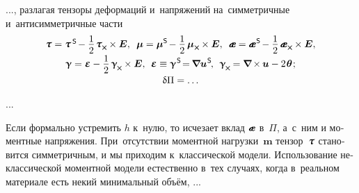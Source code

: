 \begin{otherlanguage}{russian}
..., разлагая тензоры деформаций и~напряжений на~симметричные и~антисимметричные части
\begin{equation}
\begin{array}{c}
\mathboldtau = \mathboldtau^{\hspace{.32ex}\mathsf{S}} \hspace{-0.25ex} - \displaystyle \onehalf \hspace{.2ex} \mathboldtau_{\hspace{-0.1ex}\Xcompanion} \hspace{-0.1ex} \times \bm{E} , \;\:
%
\bm{\mu} = \bm{\mu}^{\mathsf{S}} \hspace{-0.25ex} - \displaystyle \onehalf \hspace{.32ex} \bm{\mu}_{\Xcompanion} \hspace{-0.1ex} \times \bm{E} , \;\:
%
\mathboldae = \mathboldae^{\hspace{.12ex}\mathsf{S}} \hspace{-0.25ex} - \displaystyle \onehalf \hspace{.32ex} \mathboldae_{\Xcompanion} \hspace{-0.1ex} \times \bm{E} , \\[.5em]
%
\bm{\upgamma} = \mathboldepsilon - \displaystyle \onehalf \hspace{.32ex} \bm{\upgamma}_{\hspace{-0.16ex}\Xcompanion} \hspace{-0.1ex} \times \bm{E} , \:\:
%
\mathboldepsilon \equiv \bm{\upgamma}^{\hspace{.16ex}\mathsf{S}} \hspace{-0.4ex} = \hspace{-0.2ex} \boldnabla {\bm{u}}^{\hspace{0.1ex}\mathsf{S}} \hspace{-0.25ex} , \:\:
%
\bm{\upgamma}_{\hspace{-0.16ex}\Xcompanion} \hspace{-0.16ex}
= \boldnabla \hspace{-0.16ex} \times \hspace{-0.1ex} \bm{u} - 2 \hspace{.16ex} \bm{\theta} \hspace{.15ex}; \\[.5em]
%
\variation{\Pi} = \ldots
\end{array}
\end{equation}

...


Если формально устремить $h$ к~нулю, то исчезает вклад $\mathboldae$ в~$\Pi$, а~с~ним и моментные напряжения. При~отсутствии моментной нагрузки~$\bm{m}$ тензор~$\mathboldtau$ становится симметричным, и мы приходим к~классической модели. Использование неклассической моментной модели естественно в~тех случаях, когда в~реальном материале есть некий минимальный объём, ...


\end{otherlanguage}
